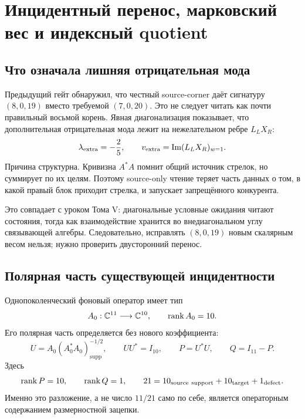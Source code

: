 \chapter{Инцидентный перенос, марковский вес и индексный quotient}
\label{ch:v7-incidence-transfer-markov-weight-gate}

\section{Что означала лишняя отрицательная мода}

Предыдущий гейт обнаружил, что честный source-corner даёт сигнатуру
$(8,0,19)$ вместо требуемой $(7,0,20)$. Это не следует читать как почти
правильный восьмой корень. Явная диагонализация показывает, что дополнительная
отрицательная мода лежит на нежелательном ребре $L_LX_R$:
\begin{equation}
 \lambda_{\rm extra}=-\frac25,
 \qquad
 v_{\rm extra}=\operatorname{Im}(L_LX_R)_{w=1}.
 \label{eq:v7-transfer-extra-source-mode}
\end{equation}
Причина структурна. Кривизна $A^*A$ помнит общий источник стрелок, но
суммирует по их целям. Поэтому source-only чтение теряет часть данных о том,
в какой правый блок приходит стрелка, и запускает запрещённого конкурента.

Это совпадает с уроком Тома V: диагональные условные ожидания читают
состояния, тогда как взаимодействие хранится во внедиагональном углу
связывающей алгебры. Следовательно, исправлять $(8,0,19)$ новым скалярным
весом нельзя; нужно проверить двусторонний перенос.

\section{Полярная часть существующей инцидентности}

Однопоколенческий фоновый оператор имеет тип
\begin{equation}
 A_0:\mathbb C^{11}\longrightarrow\mathbb C^{10},
 \qquad \operatorname{rank} A_0=10.
 \label{eq:v7-transfer-reference-rank}
\end{equation}
Его полярная часть определяется без нового коэффициента:
\begin{equation}
 U=A_0(A_0^*A_0)^{-1/2}_{\operatorname{supp}},
 \qquad
 UU^*=I_{10},
 \qquad
 P=U^*U,
 \qquad Q=I_{11}-P.
 \label{eq:v7-transfer-polar-coisometry}
\end{equation}
Здесь
\begin{equation}
 \operatorname{rank} P=10,
 \qquad \operatorname{rank} Q=1,
 \qquad
 21=10_{\rm source\ support}+10_{\rm target}+1_{\rm defect}.
 \label{eq:v7-transfer-index-decomposition}
\end{equation}
Именно это разложение, а не число $11/21$ само по себе, является операторным
содержанием размерностной зацепки.

